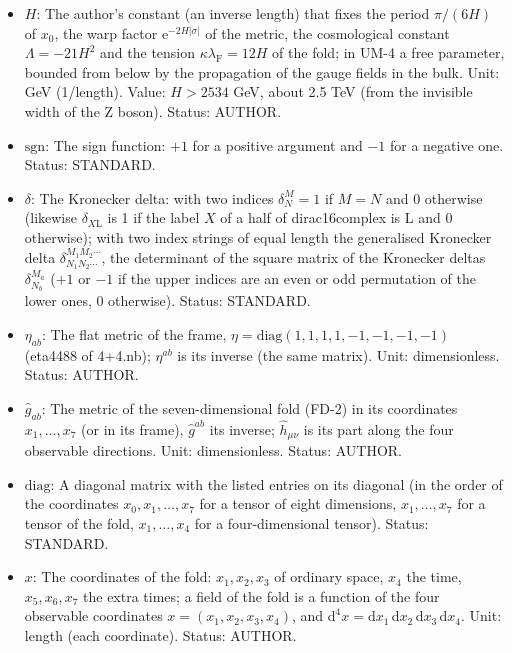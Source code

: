 \documentclass[
  10pt,
]{article}
\begin{document}
\begin{itemize}
  \(0 < z < \pi\); \(\sigma = 0\) is the fold \(z = \pi/2\),
  \(\sigma \to \mp\infty\) the tips \(z \to 0, \pi\); one period of
  \(x_0\) is the whole line \(-\infty < \sigma < \infty\). Unit: length.
  Status: DERIVED.
\item
  \(H\): The author's constant (an inverse length) that fixes the period
  \(\pi/(6H)\) of \(x_0\), the warp factor
  \(\mathrm{e}^{-2H\lvert\sigma\rvert}\) of the metric, the cosmological
  constant \(\Lambda = -21H^2\) and the tension
  \(\kappa\lambda_{\mathrm{F}} = 12H\) of the fold; in UM-4 a free
  parameter, bounded from below by the propagation of the gauge fields
  in the bulk. Unit: GeV (1/length). Value: \(H > 2534\) GeV, about 2.5
  TeV (from the invisible width of the Z boson). Status: AUTHOR.
\item
  \(\mathrm{sgn}\): The sign function: \(+1\) for a positive argument
  and \(-1\) for a negative one. Status: STANDARD.
\item
  \(\delta\): The Kronecker delta: with two indices \(\delta^M_N = 1\)
  if \(M = N\) and 0 otherwise (likewise \(\delta_{X\mathrm{L}}\) is 1
  if the label \(X\) of a half of dirac16complex is L and 0 otherwise);
  with two index strings of equal length the generalised Kronecker delta
  \(\delta^{M_1M_2\cdots}_{N_1N_2\cdots}\), the determinant of the
  square matrix of the Kronecker deltas \(\delta^{M_a}_{N_b}\) (\(+1\)
  or \(-1\) if the upper indices are an even or odd permutation of the
  lower ones, 0 otherwise). Status: STANDARD.
\item
  \(\eta_{ab}\): The flat metric of the frame,
  \(\eta = \mathrm{diag}(1, 1, 1, 1, -1, -1, -1, -1)\) (eta4488 of
  4+4.nb); \(\eta^{ab}\) is its inverse (the same matrix). Unit:
  dimensionless. Status: AUTHOR.
\item
  \(\hat g_{ab}\): The metric of the seven-dimensional fold (FD-2) in
  its coordinates \(x_1, \dots, x_7\) (or in its frame), \(\hat g^{ab}\)
  its inverse; \(\hat h_{\mu\nu}\) is its part along the four observable
  directions. Unit: dimensionless. Status: AUTHOR.
\item
  \(\mathrm{diag}\): A diagonal matrix with the listed entries on its
  diagonal (in the order of the coordinates \(x_0, x_1, \dots, x_7\) for
  a tensor of eight dimensions, \(x_1, \dots, x_7\) for a tensor of the
  fold, \(x_1, \dots, x_4\) for a four-dimensional tensor). Status:
  STANDARD.
\item
  \(x\): The coordinates of the fold: \(x_1, x_2, x_3\) of ordinary
  space, \(x_4\) the time, \(x_5, x_6, x_7\) the extra times; a field of
  the fold is a function of the four observable coordinates
  \(x = (x_1, x_2, x_3, x_4)\), and
  \(\mathrm{d}^4x = \mathrm{d}x_1\,\mathrm{d}x_2\,\mathrm{d}x_3\,\mathrm{d}x_4\).
  Unit: length (each coordinate). Status: AUTHOR.
\end{itemize}
\end{document}

